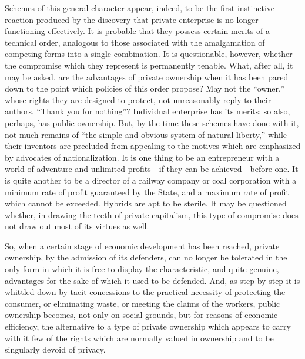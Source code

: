 \documentclass{book}
\begin{document}
Schemes of this general character appear, indeed, to be the first instinctive reaction produced by the discovery that private enterprise is no longer functioning effectively. It is probable that they possess certain merits of a technical order, analogous to those associated with the amalgamation of competing forms into a single combination. It is questionable, however, whether the compromise which they represent is permanently tenable. What, after all, it may be asked, are the advantages of private ownership when it has been pared down to the point which policies of this order propose? May not the “owner,” whose rights they are designed to protect, not unreasonably reply to their authors, “Thank you for nothing”? Individual enterprise has its merits: so also, perhaps, has public ownership. But, by the time these schemes have done with it, not much remains of “the simple and obvious system of natural liberty,” while their inventors are precluded from appealing to the motives which are emphasized by advocates of nationalization. It is one thing to be an entrepreneur with a world of adventure and unlimited profits—if they can be achieved—before one. It is quite another to be a director of a railway company or coal corporation with a minimum rate of profit guaranteed by the State, and a maximum rate of profit which cannot be exceeded. Hybrids are apt to be sterile. It may be questioned whether, in drawing the teeth of private capitalism, this type of compromise does not draw out most of its virtues as well.

So, when a certain stage of economic development has been reached, private ownership, by the admission of its defenders, can no longer be tolerated in the only form in which it is free to display the characteristic, and quite genuine, advantages for the sake of which it used to be defended. And, as step by step it is whittled down by tacit concessions to the practical necessity of protecting the consumer, or eliminating waste, or meeting the claims of the workers, public ownership becomes, not only on social grounds, but for reasons of economic efficiency, the alternative to a type of private ownership which appears to carry with it few of the rights which are normally valued in ownership and to be singularly devoid of privacy.
\end{document}
